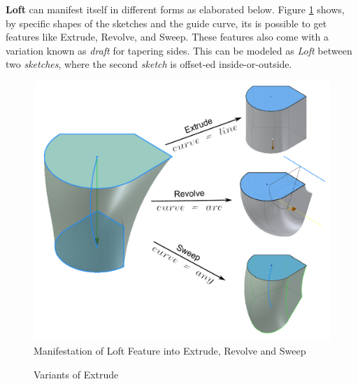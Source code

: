 {\bf Loft} can manifest itself in different forms as elaborated below. Figure \ref{fig:abstraction:extruderevolvesweepasloft} shows, by specific shapes of the sketches and the guide curve, its is possible to get features like Extrude, Revolve, and Sweep. These features also come with a variation known as {\em draft}  for tapering sides. This can be modeled as {\em Loft} between two {\em sketches}, where the second {\em sketch} is offset-ed inside-or-outside.


\begin{figure}[htbp]
\centering
	\includegraphics[scale=0.55]{../Common/images//LoftExtrudeRevSwp.pdf} 
\caption{Manifestation of Loft Feature into Extrude, Revolve and Sweep}
\label{fig:abstraction:extruderevolvesweepasloft}
\end{figure}


\begin{figure}[!h]
\centering 
{}\quad
{}

\caption{Variants of Extrude}
\label{fig_extrvar}
\end{figure}

